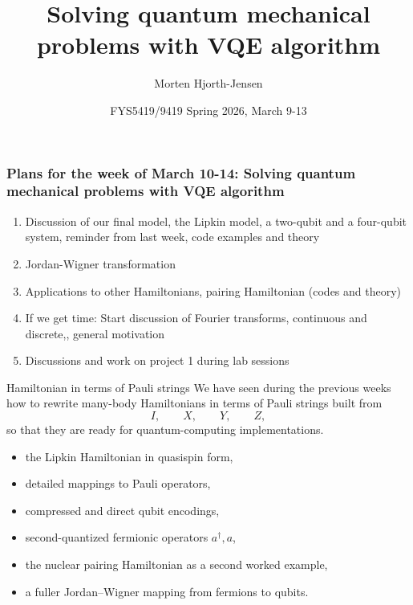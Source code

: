 \documentclass[aspectratio=169]{beamer}
\title{Solving quantum mechanical problems with VQE algorithm}
\author{Morten Hjorth-Jensen}
\date{FYS5419/9419 Spring 2026, March 9-13}
\begin{document}
\frame{\titlepage}

\begin{frame}
\frametitle{Plans for the week of March 10-14: Solving quantum mechanical problems with VQE algorithm}

\begin{block}{}
\begin{enumerate}
\item Discussion of  our final model, the Lipkin model, a two-qubit and a four-qubit system, reminder from last week, code examples and theory



\item Jordan-Wigner transformation

\item Applications to other Hamiltonians, pairing Hamiltonian  (codes and theory)

\item If we get time: Start discussion of Fourier transforms, continuous and discrete,, general motivation

\item Discussions and work on project 1 during lab sessions
\end{enumerate}

\noindent
\end{block}
\end{frame}



\begin{frame}{Hamiltonian in terms of Pauli strings}
We have seen during the previous weeks how to rewrite many-body Hamiltonians in terms of Pauli strings
built from
\[
I,\qquad X,\qquad Y,\qquad Z,
\]
so that they are ready for quantum-computing implementations.

\medskip

\begin{itemize}
\item the Lipkin Hamiltonian in quasispin form,
\item detailed mappings to Pauli operators,
\item compressed and direct qubit encodings,
\item second-quantized fermionic operators \(a^\dagger,a\),
\item the nuclear pairing Hamiltonian as a second worked example,
\item a fuller Jordan--Wigner mapping from fermions to qubits.
\end{itemize}
\end{frame}
\end{document}
